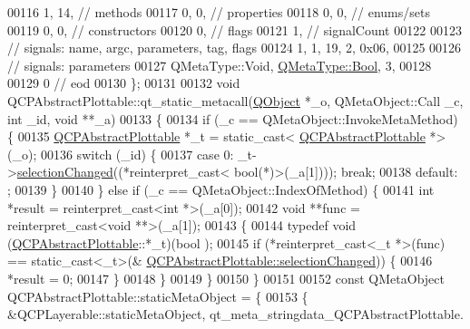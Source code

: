 \begin{DoxyCode}
00116        1,   14, \textcolor{comment}{// methods}
00117        0,    0, \textcolor{comment}{// properties}
00118        0,    0, \textcolor{comment}{// enums/sets}
00119        0,    0, \textcolor{comment}{// constructors}
00120        0,       \textcolor{comment}{// flags}
00121        1,       \textcolor{comment}{// signalCount}
00122 
00123  \textcolor{comment}{// signals: name, argc, parameters, tag, flags}
00124        1,    1,   19,    2, 0x06,
00125 
00126  \textcolor{comment}{// signals: parameters}
00127     QMetaType::Void, \hyperlink{a00004_a76a8b016e5ad61faf9062cc387df5016}{QMetaType::Bool},    3,
00128 
00129        0        \textcolor{comment}{// eod}
00130 \};
00131 
00132 \textcolor{keywordtype}{void} QCPAbstractPlottable::qt\_static\_metacall(\hyperlink{a00059}{QObject} *\_o, QMetaObject::Call \_c, \textcolor{keywordtype}{int} \_id, \textcolor{keywordtype}{void} **\_a)
00133 \{
00134     \textcolor{keywordflow}{if} (\_c == QMetaObject::InvokeMetaMethod) \{
00135         \hyperlink{a00024}{QCPAbstractPlottable} *\_t = \textcolor{keyword}{static\_cast<}
      \hyperlink{a00024}{QCPAbstractPlottable} *\textcolor{keyword}{>}(\_o);
00136         \textcolor{keywordflow}{switch} (\_id) \{
00137         \textcolor{keywordflow}{case} 0: \_t->\hyperlink{a00024_a3af66432b1dca93b28e00e78a8c7c1d9}{selectionChanged}((*\textcolor{keyword}{reinterpret\_cast<} \textcolor{keywordtype}{bool}(*)\textcolor{keyword}{>}(\_a[1]))); \textcolor{keywordflow}{break};
00138         \textcolor{keywordflow}{default}: ;
00139         \}
00140     \} \textcolor{keywordflow}{else} \textcolor{keywordflow}{if} (\_c == QMetaObject::IndexOfMethod) \{
00141         \textcolor{keywordtype}{int} *result = \textcolor{keyword}{reinterpret\_cast<}\textcolor{keywordtype}{int} *\textcolor{keyword}{>}(\_a[0]);
00142         \textcolor{keywordtype}{void} **func = \textcolor{keyword}{reinterpret\_cast<}\textcolor{keywordtype}{void} **\textcolor{keyword}{>}(\_a[1]);
00143         \{
00144             \textcolor{keyword}{typedef} void (\hyperlink{a00024}{QCPAbstractPlottable}::*\_t)(bool );
00145             \textcolor{keywordflow}{if} (*reinterpret\_cast<\_t *>(func) == \textcolor{keyword}{static\_cast<}\_t\textcolor{keyword}{>}(&
      \hyperlink{a00024_a3af66432b1dca93b28e00e78a8c7c1d9}{QCPAbstractPlottable::selectionChanged})) \{
00146                 *result = 0;
00147             \}
00148         \}
00149     \}
00150 \}
00151 
00152 \textcolor{keyword}{const} QMetaObject QCPAbstractPlottable::staticMetaObject = \{
00153     \{ &QCPLayerable::staticMetaObject, qt\_meta\_stringdata\_QCPAbstractPlottable.

\end{DoxyCode}
